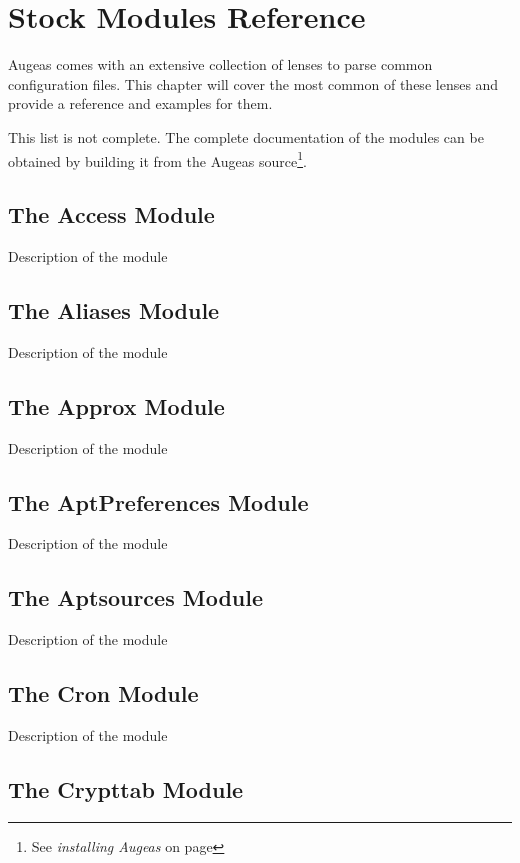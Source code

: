 \chapter{Stock Modules Reference}

Augeas comes with an extensive collection of lenses to parse common configuration files. This chapter will cover the most common of these lenses and provide a reference and examples for them.

This list is not complete. The complete documentation of the modules can be obtained by building it from the Augeas source\footnote{See \emph{installing Augeas} on page \pageref{sec:installing_augeas}}.

\section{The Access Module}

Description of the module

\section{The Aliases Module}

Description of the module

\section{The Approx Module}

Description of the module

\section{The AptPreferences Module}

Description of the module

\section{The Aptsources Module}

Description of the module

\section{The Cron Module}

Description of the module

\section{The Crypttab Module}

